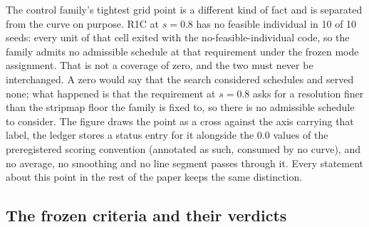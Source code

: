 \documentclass[preprint,authoryear]{elsarticle}
\begin{document}
\label{sec:floor}The control family's tightest grid point is a different kind of fact and is separated from the curve on purpose. R1C at $s=0.8$ has no feasible individual in 10 of 10 seeds: every unit of that cell exited with the no-feasible-individual code, so the family admits no admissible schedule at that requirement under the frozen mode assignment. That is not a coverage of zero, and the two must never be interchanged. A zero would say that the search considered schedules and served none; what happened is that the requirement at $s=0.8$ asks for a resolution finer than the stripmap floor the family is fixed to, so there is no admissible schedule to consider. The figure draws the point as a cross against the axis carrying that label, the ledger stores a status entry for it alongside the 0.0 values of the preregistered scoring convention (annotated as such, consumed by no curve), and no average, no smoothing and no line segment passes through it. Every statement about this point in the rest of the paper keeps the same distinction.

\subsection{The frozen criteria and their verdicts}\label{sec:criteria}
\end{document}
